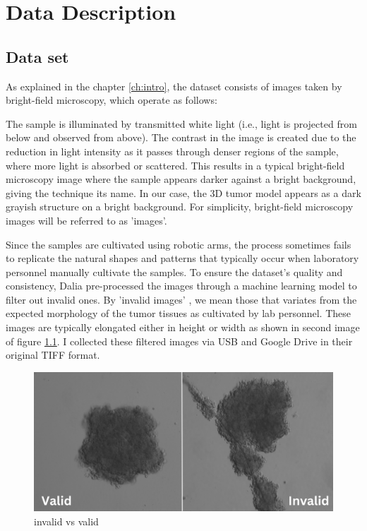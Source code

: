 \chapter{Data Description}\label{ch: DataDescription}
\section{Data set}
\label{sec:Data set}
As explained in the chapter \ref{ch:intro}, the dataset consists of images taken by bright-field microscopy, which operate as follows: 

The sample is illuminated by transmitted white light (i.e., light is projected from below and observed from above).
 The contrast in the image is created due to the reduction in light intensity as it passes through denser regions of the sample, where more light is
  absorbed or scattered. This results in a typical bright-field microscopy image where the sample appears darker against a bright background, giving 
the technique its name. In our case, the 3D tumor model appears as a dark grayish structure on a bright background. 
For simplicity, bright-field microscopy images will be referred to as 'images'.

 Since the samples are cultivated using robotic arms, the process sometimes fails to replicate the natural shapes and patterns that typically occur when laboratory personnel manually cultivate the samples. To ensure the 
 dataset's quality and consistency, Dalia pre-processed the images through a machine learning model to filter out invalid ones. By 'invalid images' , we mean
  those that variates from the expected morphology of the tumor tissues as cultivated by lab personnel. These images are typically elongated either in height or width as shown in second image 
 of figure \ref{fig:valid}. I collected these filtered images via USB and Google Drive in their original TIFF format. 

  \begin{figure}[H]
    \centering
    \includegraphics[scale=0.4]{figures/finevalid.png} 
    \caption{invalid vs valid}
    \label{fig:valid}
  \end{figure}

